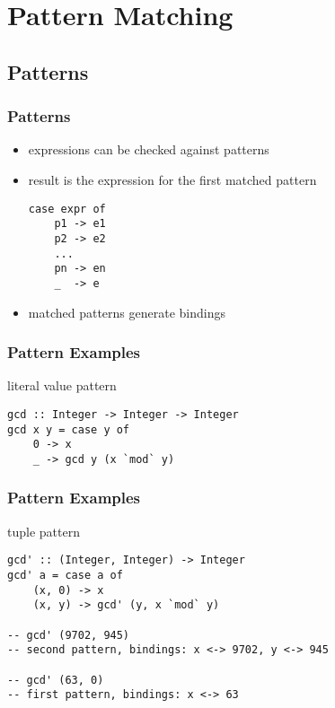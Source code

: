 \documentclass[dvipsnames]{beamer}
\theoremstyle{plain}
\begin{document}
\section{Pattern Matching}

\subsection{Patterns}

\begin{frame}[fragile]
  \frametitle{Patterns}

  \begin{itemize}
    \item expressions can be checked against patterns
    \item result is the expression for the first matched pattern
    \begin{lstlisting}[style=syntax]
case expr of
    p1 -> e1
    p2 -> e2
    ...
    pn -> en
    _  -> e
    \end{lstlisting}
    \item matched patterns generate bindings
  \end{itemize}
\end{frame}

\begin{frame}[fragile]
  \frametitle{Pattern Examples}

  \begin{exampleblock}{literal value pattern}
    \begin{lstlisting}
gcd :: Integer -> Integer -> Integer
gcd x y = case y of
    0 -> x
    _ -> gcd y (x `mod` y)
    \end{lstlisting}
  \end{exampleblock}
\end{frame}

\begin{frame}[fragile]
  \frametitle{Pattern Examples}

  \begin{exampleblock}{tuple pattern}
    \begin{lstlisting}
gcd' :: (Integer, Integer) -> Integer
gcd' a = case a of
    (x, 0) -> x
    (x, y) -> gcd' (y, x `mod` y)

-- gcd' (9702, 945)
-- second pattern, bindings: x <-> 9702, y <-> 945

-- gcd' (63, 0)
-- first pattern, bindings: x <-> 63
    \end{lstlisting}
  \end{exampleblock}
\end{frame}
\end{document}

